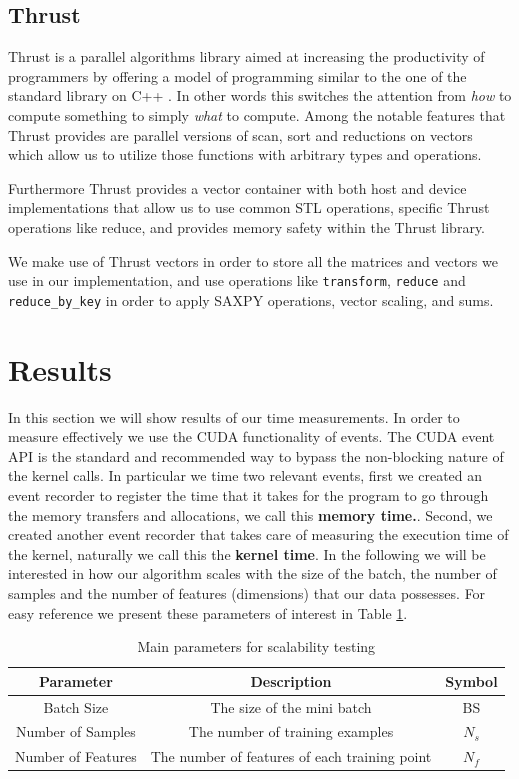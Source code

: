 \documentclass[11pt,a4paper]{article}
\begin{document}
\subsection{Thrust}
Thrust is a parallel algorithms library aimed at increasing the productivity of programmers by
offering a model of programming similar to the one of the standard library on C++
\citep{bell2012thrust}. In other words this switches the attention from \textit{how} to compute
something to simply \textit{what} to compute. Among the notable features that
Thrust provides are parallel versions of scan, sort and reductions on vectors which allow us
to utilize those functions with arbitrary types and operations.

Furthermore Thrust provides a vector container with both host and device implementations that allow us
to use common STL operations, specific Thrust operations like reduce, and provides memory safety
within the Thrust library.

We make use of Thrust vectors in order to store all the matrices and vectors we use
in our implementation, and use operations like \texttt{transform}, \texttt{reduce} and \texttt{reduce\_by\_key} in order to apply SAXPY operations, vector scaling, and sums.


\section{Results}

In this section we will show results of our time measurements. In order to measure effectively we
use the CUDA functionality of events. The CUDA event API is the standard and recommended way to 
bypass the non-blocking  nature of the kernel calls. 
In particular we time two relevant events, first we created an event recorder to 
register the time that it takes for the program to go through the memory transfers 
and allocations, we call this \textbf{memory time.}. Second, we created another event
recorder that takes care of measuring the execution time of the kernel, naturally we 
call this the \textbf{kernel time}. In the following we will be interested in how our 
algorithm scales with the size of the batch, the number of samples and the number 
of features (dimensions) that our data possesses. For easy 
reference we present these parameters of interest in Table \ref{table:parameters}.


\begin{table}[H]
\centering
\begin{tabular}{|c|c|c|}
\hline
Parameter & Description & Symbol\\
\hline
Batch Size & The size of the mini batch & BS \\
\hline
Number of Samples & The number of training examples & $N_s$ \\
\hline
Number of Features & The number of features of each training point & $N_f$ \\
\hline
\end{tabular}
\caption{Main parameters for scalability testing}
\label{table:parameters}
\end{table}
\end{document}
